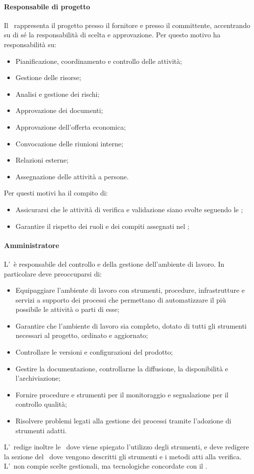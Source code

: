 \documentclass[../NormeProgetto.tex]{subfiles}
\begin{document}
			\paragraph{Responsabile di progetto}
			Il \responsabilediprogetto\ rappresenta il progetto presso il fornitore e presso il committente, accentrando su di sé la responsabilità di scelta e approvazione. Per questo motivo ha responsabilità su:
			\begin{itemize}
			\item Pianificazione, coordinamento e controllo delle attività;
			\item Gestione delle risorse;
			\item Analisi e gestione dei rischi;
			\item Approvazione dei documenti;
			\item Approvazione dell'offerta economica;
			\item Convocazione delle riunioni interne;
			\item Relazioni esterne;
			\item Assegnazione delle attività a persone.
			\end{itemize}
			Per questi motivi ha il compito di:
			\begin{itemize}
			\item Assicurarsi che le attività di verifica e validazione siano svolte seguendo le \normediprogetto;
			\item Garantire il rispetto dei ruoli e dei compiti assegnati nel \pianodiprogetto;
			\end{itemize}
			\paragraph{Amministratore}
			L'\amministratore\ è responsabile del controllo e della gestione dell'ambiente di lavoro. In particolare deve preoccuparsi di:
			\begin{itemize}
			\item Equipaggiare l'ambiente di lavoro con strumenti, procedure, infrastrutture e servizi a supporto dei processi che permettano di automatizzare il più possibile le attività o parti di esse;
			\item Garantire che l'ambiente di lavoro sia completo, dotato di tutti gli strumenti necessari al progetto, ordinato e aggiornato;
			\item Controllare le versioni e configurazioni del prodotto\g;
			\item Gestire la documentazione, controllarne la diffusione, la disponibilità e l'archiviazione;
			\item Fornire procedure e strumenti per il monitoraggio e segnalazione per il controllo qualità;
			\item Risolvere problemi legati alla gestione dei processi tramite l'adozione di strumenti adatti.
			\end{itemize}
			L'\amministratore\ redige inoltre le \normediprogetto\, dove viene spiegato l'utilizzo degli strumenti, e deve redigere la sezione del \pianodiqualifica\ dove vengono descritti gli strumenti e i metodi atti alla verifica. L'\amministratore\ non compie scelte gestionali, ma tecnologiche concordate con il \responsabilediprogetto.
\end{document}
